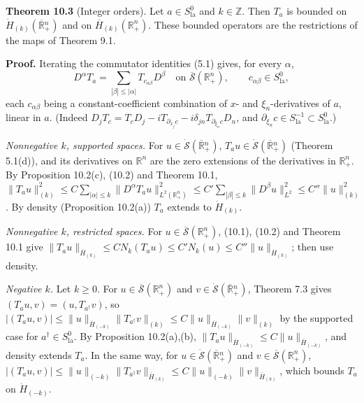 \documentclass[
  11pt,
]{article}
\begin{document}
\textbf{Theorem 10.3} (Integer orders). Let \(a\in S^0_{\mathrm{la}}\)
and \(k\in\mathbb Z\). Then \(T_a\) is bounded on
\(\dot H_{(k)}(\overline{\mathbb R}{}^n_+)\) and on
\(\overline H_{(k)}(\mathbb R^n_+)\). These bounded operators are the
restrictions of the maps of Theorem 9.1.

\textbf{Proof.} Iterating the commutator identities (5.1) gives, for
every \(\alpha\), \[
D^\alpha T_a=\sum_{|\beta|\leq|\alpha|}T_{c_{\alpha\beta}}D^\beta\quad\text{on }\overline{\mathcal S}(\mathbb R^n_+),\qquad c_{\alpha\beta}\in S^0_{\mathrm{la}},
\tag{10.2}
\] each \(c_{\alpha\beta}\) being a constant-coefficient combination of
\(x\)- and \(\xi_n\)-derivatives of \(a\), linear in \(a\). (Indeed
\(D_jT_c=T_cD_j-iT_{\partial_{x_j}c}-i\delta_{jn}T_{\partial_{\xi_n}c}D_n\),
and
\(\partial_{\xi_n}c\in S^{-1}_{\mathrm{la}}\subset S^0_{\mathrm{la}}\).)

\emph{Nonnegative \(k\), supported spaces.} For
\(u\in\dot{\mathcal S}(\overline{\mathbb R}{}^n_+)\),
\(T_au\in\dot{\mathcal S}(\overline{\mathbb R}{}^n_+)\) (Theorem
5.1(d)), and its derivatives on \(\mathbb R^n\) are the zero extensions
of the derivatives in \(\mathbb R^n_+\). By Proposition 10.2(c), (10.2)
and Theorem 10.1,
\(\|T_au\|_{(k)}^2\leq C\sum_{|\alpha|\leq k}\|D^\alpha T_au\|^2_{L^2(\mathbb R^n_+)}\leq C'\sum_{|\beta|\leq k}\|D^\beta u\|^2_{L^2}\leq C''\|u\|^2_{(k)}\).
By density (Proposition 10.2(a)) \(T_a\) extends to \(\dot H_{(k)}\).

\emph{Nonnegative \(k\), restricted spaces.} For
\(u\in\overline{\mathcal S}(\mathbb R^n_+)\), (10.1), (10.2) and Theorem
10.1 give
\(\|T_au\|_{\overline H_{(k)}}\leq CN_k(T_au)\leq C'N_k(u)\leq C''\|u\|_{\overline H_{(k)}}\);
then use density.

\emph{Negative \(k\).} Let \(k\geq0\). For
\(u\in\overline{\mathcal S}(\mathbb R^n_+)\) and
\(v\in\dot{\mathcal S}(\overline{\mathbb R}{}^n_+)\), Theorem 7.3 gives
\((T_au,v)=(u,T_{a^\dagger}v)\), so
\(|(T_au,v)|\leq\|u\|_{\overline H_{(-k)}}\|T_{a^\dagger}v\|_{(k)}\leq C\|u\|_{\overline H_{(-k)}}\|v\|_{(k)}\)
by the supported case for \(a^\dagger\in S^0_{\mathrm{la}}\). By
Proposition 10.2(a),(b),
\(\|T_au\|_{\overline H_{(-k)}}\leq C\|u\|_{\overline H_{(-k)}}\), and
density extends \(T_a\). In the same way, for
\(u\in\dot{\mathcal S}(\overline{\mathbb R}{}^n_+)\) and
\(v\in\overline{\mathcal S}(\mathbb R^n_+)\),
\(|(T_au,v)|\leq\|u\|_{(-k)}\|T_{a^\dagger}v\|_{\overline H_{(k)}}\leq C\|u\|_{(-k)}\|v\|_{\overline H_{(k)}}\),
which bounds \(T_a\) on \(\dot H_{(-k)}\).
\end{document}
